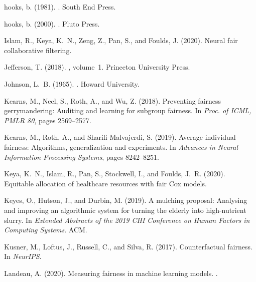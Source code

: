 \documentclass[11pt,dvipdfm]{article}
\begin{document}
\begin{thebibliography}{}
	hooks, b. (1981).
	.
	\newblock South End Press.
	
	hooks, b. (2000).
	.
	\newblock Pluto Press.
	
	Islam, R., Keya, K.~N., Zeng, Z., Pan, S., and Foulds, J. (2020).
	\newblock Neural fair collaborative filtering.
	
	Jefferson, T. (2018).
	, volume~1.
	\newblock Princeton University Press.
	
	Johnson, L.~B. (1965).
	.
	\newblock Howard University.
	
	Kearns, M., Neel, S., Roth, A., and Wu, Z. (2018).
	\newblock Preventing fairness gerrymandering: Auditing and learning for
	subgroup fairness.
	\newblock In {\em Proc. of ICML, PMLR 80}, pages 2569--2577.
	
	Kearns, M., Roth, A., and Sharifi-Malvajerdi, S. (2019).
	\newblock Average individual fairness: Algorithms, generalization and
	experiments.
	\newblock In {\em Advances in Neural Information Processing Systems}, pages
	8242--8251.
	
	Keya, K.~N., Islam, R., Pan, S., Stockwell, I., and Foulds, J.~R. (2020).
	\newblock Equitable allocation of healthcare resources with fair {C}ox models.
	
	Keyes, O., Hutson, J., and Durbin, M. (2019).
	\newblock A mulching proposal: Analysing and improving an algorithmic system
	for turning the elderly into high-nutrient slurry.
	\newblock In {\em Extended Abstracts of the 2019 CHI Conference on Human
		Factors in Computing Systems}. ACM.
	
	Kusner, M., Loftus, J., Russell, C., and Silva, R. (2017).
	\newblock Counterfactual fairness.
	\newblock In {\em NeurIPS}.
	
	Landeau, A. (2020).
	\newblock Measuring fairness in machine learning models.
	.
	

\end{thebibliography}
\end{document}
